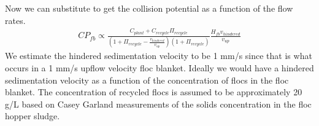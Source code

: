 \documentclass[letterpaper,10pt,english]{sphinxmanual}
\begin{document}
Now we can substitute to get the collision potential as a function of the flow rates.
\begin{equation}\label{equation:Sedimentation/Sed_Theory_and_Future_Work:Sedimentation/Sed_Theory_and_Future_Work:10}
\begin{split}CP_{fb} \propto \frac{C_{plant} + C_{recycle}\Pi_{recycle}}{\left(1+\Pi_{recycle}-\frac{v_{hindered}}{v_{up}}\right)\left( 1 + \Pi_{recycle} \right)}  \frac{H_{fb}v_{hindered}} {v_{up}}\end{split}
\end{equation}
We estimate the hindered sedimentation velocity to be 1 mm/s since that is what occurs in a 1 mm/s upflow velocity floc blanket. Ideally we would have a hindered sedimentation velocity as a function of the concentration of flocs in the floc blanket. The concentration of recycled flocs is assumed to be approximately 20 g/L based on Casey Garland measurements of the solids concentration in the floc hopper sludge.
\end{document}
